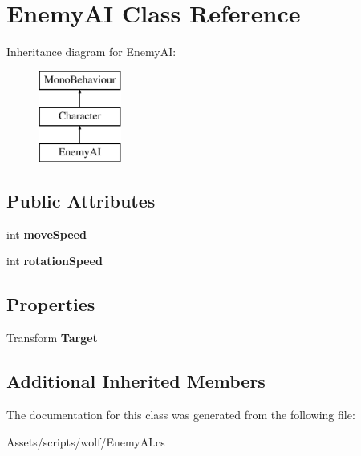 \hypertarget{class_enemy_a_i}{}\section{Enemy\+AI Class Reference}
\label{class_enemy_a_i}
Inheritance diagram for Enemy\+AI\+:\begin{figure}[H]
\begin{center}
\leavevmode
\includegraphics[height=3.000000cm]{class_enemy_a_i}
\end{center}
\end{figure}
\subsection*{Public Attributes}
\begin{DoxyCompactItemize}
\item 
\mbox{\label{class_enemy_a_i_ae2f05a293142e35de08b31436e465c91}} 
int {\bfseries move\+Speed}
\item 
\mbox{\label{class_enemy_a_i_a33318434d46bd816d36c30b38ab17bc3}} 
int {\bfseries rotation\+Speed}
\end{DoxyCompactItemize}
\subsection*{Properties}
\begin{DoxyCompactItemize}
\item 
\mbox{\label{class_enemy_a_i_acdbde922eb7ccaabcf410b5051fcb241}} 
Transform {\bfseries Target}
\end{DoxyCompactItemize}
\subsection*{Additional Inherited Members}


The documentation for this class was generated from the following file\+:\begin{DoxyCompactItemize}
\item 
Assets/scripts/wolf/Enemy\+A\+I.\+cs\end{DoxyCompactItemize}
